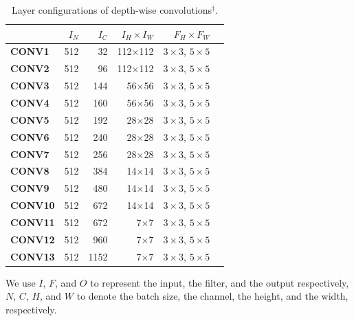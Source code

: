 \begin{table}[]
\caption{Layer configurations of depth-wise  convolutions$^{\dag}$.}
\label{tab:depconvconfigs}
\centering
{}
\begin{threeparttable}
\begin{tabular}{lrrrrr}
\toprule
& \textbf{$I_N$} & \textbf{$I_C$} & \textbf{$I_H \times I_W$ }&  \textbf{$F_H \times F_W$} \\
\midrule
\textbf{CONV1} & 512  & 32    & 112$\times$112 & $3 \times 3$, $5 \times 5$  \\
\textbf{CONV2} & 512  & 96    & 112$\times$112  &$3 \times 3$, $5 \times 5$   \\
\textbf{CONV3} & 512  & 144   & 56$\times$56  &$3 \times 3$, $5 \times 5$    \\
\textbf{CONV4} & 512  & 160    & 56$\times$56  &$3 \times 3$, $5 \times 5$    \\
\textbf{CONV5} & 512  & 192   & 28$\times$28  &$3 \times 3$, $5 \times 5$    \\
\textbf{CONV6} & 512  & 240   & 28$\times$28  &$3 \times 3$, $5 \times 5$    \\
\textbf{CONV7} & 512  & 256   & 28$\times$28  &$3 \times 3$, $5 \times 5$    \\
\textbf{CONV8} & 512  & 384   & 14$\times$14  &$3 \times 3$, $5 \times 5$    \\
\textbf{CONV9} & 512  & 480   & 14$\times$14  &$3 \times 3$, $5 \times 5$    \\
\textbf{CONV10} & 512  & 672  & 14$\times$14 &$3 \times 3$, $5 \times 5$     \\
\textbf{CONV11} & 512  &672  & 7$\times$7 & $3 \times 3$, $5 \times 5$      \\
\textbf{CONV12} & 512  &960  & 7$\times$7 & $3 \times 3$, $5 \times 5$      \\
\textbf{CONV13} & 512  &1152  & 7$\times$7 & $3 \times 3$, $5 \times 5$      \\
\bottomrule
\end{tabular}
\footnotesize
\begin{tablenotes}
\item[\dag] We use $I$, $F$, and $O$ to represent the input, the filter, and the output respectively, $N$, $C$, $H$, and $W$
to denote the batch size, the channel, the height, and the width, respectively.
\end{tablenotes}
\end{threeparttable}
\vspace{-5mm}
\end{table}

